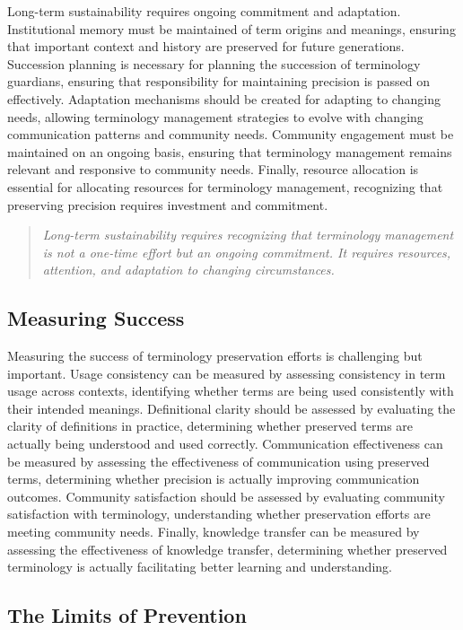\documentclass[11pt]{article}
\begin{document}
Long-term sustainability requires ongoing commitment and adaptation. Institutional memory must be maintained of term origins and meanings, ensuring that important context and history are preserved for future generations. Succession planning is necessary for planning the succession of terminology guardians, ensuring that responsibility for maintaining precision is passed on effectively. Adaptation mechanisms should be created for adapting to changing needs, allowing terminology management strategies to evolve with changing communication patterns and community needs. Community engagement must be maintained on an ongoing basis, ensuring that terminology management remains relevant and responsive to community needs. Finally, resource allocation is essential for allocating resources for terminology management, recognizing that preserving precision requires investment and commitment.

\begin{quote}
\emph{Long-term sustainability requires recognizing that terminology management is not a one-time effort but an ongoing commitment. It requires resources, attention, and adaptation to changing circumstances.}
\end{quote}

\subsection{Measuring Success}

Measuring the success of terminology preservation efforts is challenging but important. Usage consistency can be measured by assessing consistency in term usage across contexts, identifying whether terms are being used consistently with their intended meanings. Definitional clarity should be assessed by evaluating the clarity of definitions in practice, determining whether preserved terms are actually being understood and used correctly. Communication effectiveness can be measured by assessing the effectiveness of communication using preserved terms, determining whether precision is actually improving communication outcomes. Community satisfaction should be assessed by evaluating community satisfaction with terminology, understanding whether preservation efforts are meeting community needs. Finally, knowledge transfer can be measured by assessing the effectiveness of knowledge transfer, determining whether preserved terminology is actually facilitating better learning and understanding.

\subsection{The Limits of Prevention}
\end{document}
